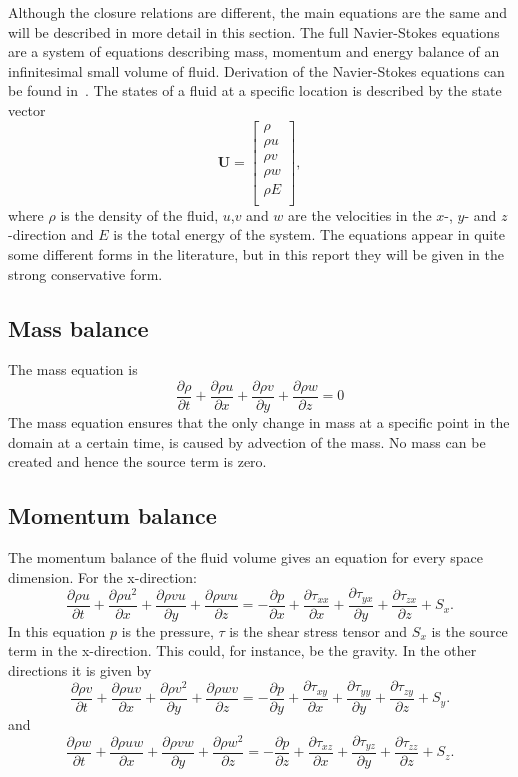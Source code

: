 \documentclass{report}
\newcommand{\dt}[1]{\frac{\partial #1}{\partial t}}
\newcommand{\dx}[1]{\frac{\partial #1}{\partial x}}
\newcommand{\dy}[1]{\frac{\partial #1}{\partial y}}
\newcommand{\dz}[1]{\frac{\partial #1}{\partial z}}
\begin{document}
Although the closure relations are different, the main equations are the same and will be described in more detail in this section. The full Navier-Stokes equations are a system of equations describing mass, momentum and energy balance of an infinitesimal small volume of fluid. Derivation of the Navier-Stokes equations can be found in~\cite{}. The states of a fluid at a specific location is described by the state vector
\begin{equation}
\label{e:stateVector}
\mathbf{U} =
\left[
\begin{array}{c}
\rho 		\\
\rho u	 	\\
\rho v		\\
\rho w		\\
\rho E		\\
\end{array}
\right],
\end{equation}
where $\rho$ is the density of the fluid, $u$,$v$ and $w$ are the velocities in the $x$-, $y$- and $z$-direction and $E$ is the total energy of the system. The equations appear in quite some different forms in the literature, but in this report they will be given in the strong conservative form.

\subsection{Mass balance}
The mass equation is
\begin{equation}
\label{e:mass_balance}
\dt{\rho} + \dx{\rho u} + \dy{\rho v} + \dz{\rho w} = 0
\end{equation}
The mass equation ensures that the only change in mass at a specific point in the domain at a certain time, is caused by advection of the mass. No mass can be created and hence the source term is zero.

\subsection{Momentum balance}
The momentum balance of the fluid volume gives an equation for every space dimension.
For the x-direction:
\begin{equation}
\label{e:momentumBalance_X}
\dt{\rho u} + \dx{\rho u^2} + \dy{\rho v u} + \dz{\rho w u} =
-\dx{p} + \dx{\tau_{xx}} + \dy{\tau_{yx}} + \dz{\tau_{zx}} + S_x.
\end{equation}
In this equation $p$ is the pressure, $\tau$ is the shear stress tensor and $S_x$ is the source term in the x-direction. This could, for instance, be the gravity.
In the other directions it is given by
\begin{equation}
\label{e:momentumBalance_Y}
\dt{\rho v} + \dx{\rho u v} + \dy{\rho v^2} + \dz{\rho w v} =
-\dy{p} + \dx{\tau_{xy}} + \dy{\tau_{yy}} + \dz{\tau_{zy}} + S_y.
\end{equation}
and
\begin{equation}
\label{e:momentumBalance_Z}
\dt{\rho w} + \dx{\rho u w} + \dy{\rho v w} + \dz{\rho w^2} =
-\dz{p} + \dx{\tau_{xz}} + \dy{\tau_{yz}} + \dz{\tau_{zz}} + S_z.
\end{equation}
\end{document}

